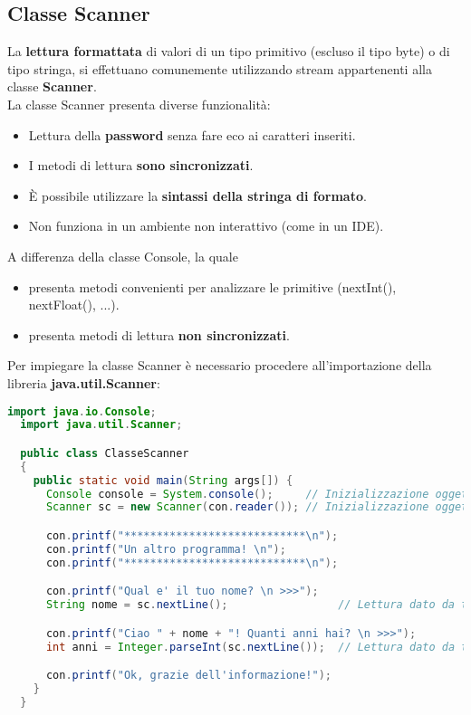 \documentclass[a4paper]{extarticle}
\begin{document}
\vspace{1em}
\subsection{Classe Scanner}
La \textbf{lettura formattata} di valori di un tipo primitivo (escluso il tipo byte) o di tipo stringa, si effettuano comunemente utilizzando stream appartenenti alla classe \textbf{Scanner}.\\
La classe Scanner presenta diverse funzionalità:
\begin{itemize}
  \item Lettura della \textbf{password} senza fare eco ai caratteri inseriti.
  \item I metodi di lettura \textbf{sono sincronizzati}.
  \item È possibile utilizzare la \textbf{sintassi della stringa di formato}.
  \item Non funziona in un ambiente non interattivo (come in un IDE).
\end{itemize}
A differenza della classe Console, la quale
\begin{itemize}
  \item presenta metodi convenienti per analizzare le primitive (nextInt(), nextFloat(), ...).
  \item presenta metodi di lettura \textbf{non sincronizzati}.
\end{itemize}
Per impiegare la classe Scanner è necessario procedere all'importazione della libreria \textbf{java.util.Scanner}:

\vspace{1em}
\noindent
\begin{lstlisting}[language=Java, caption=Classe Scanner in Java]
  import java.io.Console;
  import java.util.Scanner;

  public class ClasseScanner
  {
    public static void main(String args[]) {
      Console console = System.console();     // Inizializzazione oggetto Console
      Scanner sc = new Scanner(con.reader()); // Inizializzazione oggetto Scanner

      con.printf("****************************\n");
      con.printf("Un altro programma! \n");
      con.printf("****************************\n");

      con.printf("Qual e' il tuo nome? \n >>>");
      String nome = sc.nextLine();                 // Lettura dato da tastiera

      con.printf("Ciao " + nome + "! Quanti anni hai? \n >>>");
      int anni = Integer.parseInt(sc.nextLine());  // Lettura dato da tastiera

      con.printf("Ok, grazie dell'informazione!");
    }
  }
\end{lstlisting}
\end{document}
